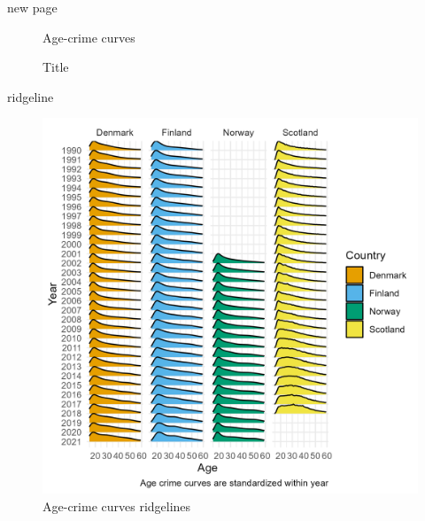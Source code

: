 \documentclass[
  ignorenonframetext,
]{beamer}
\begin{document}
\begin{frame}{new page}
\begin{figure}
\begin{minipage}[t]{0.50\linewidth}
{{}

\caption{Age-crime curves}

}

\end{minipage}%

\caption{\label{fig-acc}Title}

\end{figure}
\end{frame}

\begin{frame}{ridgeline}
\protect\hypertarget{ridgeline}{}
\begin{figure}

{\centering \includegraphics{figures/acc_ridgeline.png}

}

\caption{Age-crime curves ridgelines}

\end{figure}
\end{frame}
\end{document}
